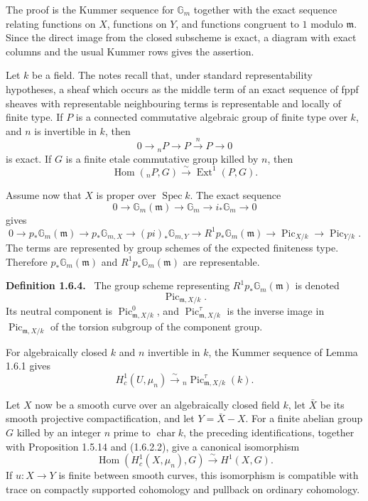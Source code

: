 \documentclass[12pt]{article}
\newenvironment{statement}[1]{\par\medskip\noindent\textbf{#1.}\ }{\par\medskip}
\begin{document}
The proof is the Kummer sequence for \(\mathbb G_m\) together with the exact sequence relating functions on \(X\), functions on \(Y\), and functions congruent to \(1\) modulo \(\mathfrak m\). Since the direct image from the closed subscheme is exact, a diagram with exact columns and the usual Kummer rows gives the assertion.

Let \(k\) be a field. The notes recall that, under standard representability hypotheses, a sheaf which occurs as the middle term of an exact sequence of fppf sheaves with representable neighbouring terms is representable and locally of finite type. If \(P\) is a connected commutative algebraic group of finite type over \(k\), and \(n\) is invertible in \(k\), then
\[
0\to {}_nP\to P\xrightarrow{n}P\to0
\tag{1.6.2.1}
\]
is exact. If \(G\) is a finite etale commutative group killed by \(n\), then
\[
\operatorname{Hom}({}_nP,G)
\xrightarrow{\sim}
\operatorname{Ext}^1(P,G).
\tag{1.6.2.2}
\]

Assume now that \(X\) is proper over \(\operatorname{Spec}k\). The exact sequence
\[
0\to\mathbb G_m(\mathfrak m)\to\mathbb G_m\to i_*\mathbb G_m\to0
\]
gives
\[
0\to p_*\mathbb G_m(\mathfrak m)
\to p_*\mathbb G_{m,X}
\to (pi)_*\mathbb G_{m,Y}
\to R^1p_*\mathbb G_m(\mathfrak m)
\to \operatorname{Pic}_{X/k}
\to \operatorname{Pic}_{Y/k}.
\tag{1.6.3.1}
\]
The terms are represented by group schemes of the expected finiteness type. Therefore \(p_*\mathbb G_m(\mathfrak m)\) and \(R^1p_*\mathbb G_m(\mathfrak m)\) are representable.

\begin{statement}{Definition 1.6.4}
The group scheme representing \(R^1p_*\mathbb G_m(\mathfrak m)\) is denoted
\[
\operatorname{Pic}_{\mathfrak m,X/k}.
\]
Its neutral component is \(\operatorname{Pic}^{0}_{\mathfrak m,X/k}\), and \(\operatorname{Pic}^{\tau}_{\mathfrak m,X/k}\) is the inverse image in \(\operatorname{Pic}_{\mathfrak m,X/k}\) of the torsion subgroup of the component group.
\end{statement}

For algebraically closed \(k\) and \(n\) invertible in \(k\), the Kummer sequence of Lemma 1.6.1 gives
\[
H^1_c(U,\mu_n)
\xrightarrow{\sim}
{}_n\operatorname{Pic}^{\tau}_{\mathfrak m,X/k}(k).
\tag{1.6.4.1}
\]

Let \(X\) now be a smooth curve over an algebraically closed field \(k\), let \(\bar X\) be its smooth projective compactification, and let \(Y=\bar X-X\). For a finite abelian group \(G\) killed by an integer \(n\) prime to \(\operatorname{char}k\), the preceding identifications, together with Proposition 1.5.14 and (1.6.2.2), give a canonical isomorphism
\[
\operatorname{Hom}(H^1_c(X,\mu_n),G)
\xrightarrow{\sim}H^1(X,G).
\tag{1.6.5}
\]
If \(u:X\to Y\) is finite between smooth curves, this isomorphism is compatible with trace on compactly supported cohomology and pullback on ordinary cohomology.
\end{document}
